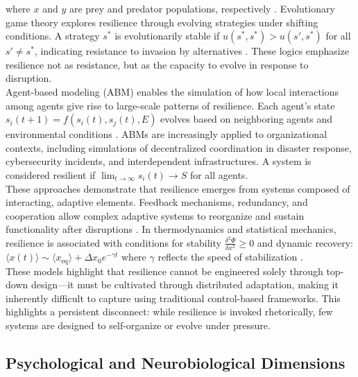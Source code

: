 where $x$ and $y$ are prey and predator populations, respectively \autocite{wangersky1978lotka}. Evolutionary game theory explores resilience through evolving strategies under shifting conditions. A strategy $s^*$ is evolutionarily stable if $u(s^*, s^*) > u(s', s^*)$ for all $s' \neq s^*$, indicating resistance to invasion by alternatives \autocite{ostrom1990governing, gunderson2002panarchy}.  These logics emphasize resilience not as resistance, but as the capacity to evolve in response to disruption.\\

Agent-based modeling (ABM) enables the simulation of how local interactions among agents give rise to large-scale patterns of resilience. Each agent’s state $s_i(t+1) = f(s_i(t), s_j(t), E)$ evolves based on neighboring agents and environmental conditions \autocite{helbing2012agent}. ABMs are increasingly applied to organizational contexts, including simulations of decentralized coordination in disaster response, cybersecurity incidents, and interdependent infrastructures. A system is considered resilient if $\lim_{t \rightarrow \infty} s_i(t) \rightarrow S$ for all agents.\\

These approaches demonstrate that resilience emerges from systems composed of interacting, adaptive elements. Feedback mechanisms, redundancy, and cooperation allow complex adaptive systems to reorganize and sustain functionality after disruptions \autocite{gao2016universal, krakovska2024resilience}. In thermodynamics and statistical mechanics, resilience is associated with conditions for stability $\frac{\delta^2\Phi}{\delta x^2} \geq 0$ and dynamic recovery:
$\langle x(t) \rangle \sim \langle x_{\textrm{eq}} \rangle + \Delta x_0 e^{-\gamma t}$ where $\gamma$ reflects the speed of stabilization \autocite{marconi2008fluctuation, pelorosso2017low}.\\

These models highlight that resilience cannot be engineered solely through top-down design—it must be cultivated through distributed adaptation, making it inherently difficult to capture using traditional control-based frameworks. This highlights a persistent disconnect: while resilience is invoked rhetorically, few systems are designed to self-organize or evolve under pressure.

\subsection{Psychological and Neurobiological Dimensions}
\label{appendix:A5}

